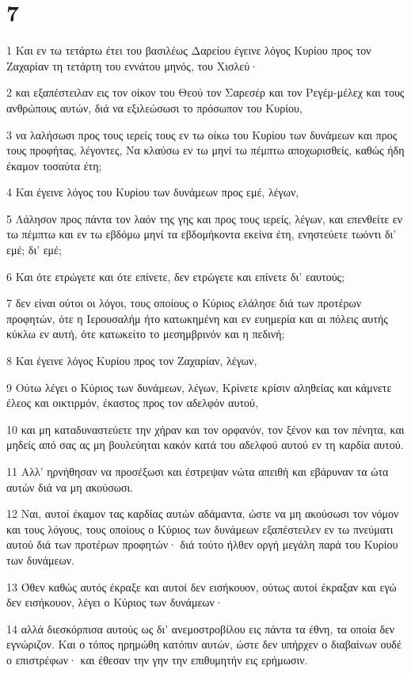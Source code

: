 \chapter{7}

\par 1 Και εν τω τετάρτω έτει του βασιλέως Δαρείου έγεινε λόγος Κυρίου προς τον Ζαχαρίαν τη τετάρτη του εννάτου μηνός, του Χισλεύ·
\par 2 και εξαπέστειλαν εις τον οίκον του Θεού τον Σαρεσέρ και τον Ρεγέμ-μέλεχ και τους ανθρώπους αυτών, διά να εξιλεώσωσι το πρόσωπον του Κυρίου,
\par 3 να λαλήσωσι προς τους ιερείς τους εν τω οίκω του Κυρίου των δυνάμεων και προς τους προφήτας, λέγοντες, Να κλαύσω εν τω μηνί τω πέμπτω αποχωρισθείς, καθώς ήδη έκαμον τοσαύτα έτη;
\par 4 Και έγεινε λόγος του Κυρίου των δυνάμεων προς εμέ, λέγων,
\par 5 Λάλησον προς πάντα τον λαόν της γης και προς τους ιερείς, λέγων, και επενθείτε εν τω πέμπτω και εν τω εβδόμω μηνί τα εβδομήκοντα εκείνα έτη, ενηστεύετε τωόντι δι' εμέ; δι' εμέ;
\par 6 Και ότε ετρώγετε και ότε επίνετε, δεν ετρώγετε και επίνετε δι' εαυτούς;
\par 7 δεν είναι ούτοι οι λόγοι, τους οποίους ο Κύριος ελάλησε διά των προτέρων προφητών, ότε η Ιερουσαλήμ ήτο κατωκημένη και εν ευημερία και αι πόλεις αυτής κύκλω εν αυτή, ότε κατωκείτο το μεσημβρινόν και η πεδινή;
\par 8 Και έγεινε λόγος Κυρίου προς τον Ζαχαρίαν, λέγων,
\par 9 Ούτω λέγει ο Κύριος των δυνάμεων, λέγων, Κρίνετε κρίσιν αληθείας και κάμνετε έλεος και οικτιρμόν, έκαστος προς τον αδελφόν αυτού,
\par 10 και μη καταδυναστεύετε την χήραν και τον ορφανόν, τον ξένον και τον πένητα, και μηδείς από σας ας μη βουλεύηται κακόν κατά του αδελφού αυτού εν τη καρδία αυτού.
\par 11 Αλλ' ηρνήθησαν να προσέξωσι και έστρεψαν νώτα απειθή και εβάρυναν τα ώτα αυτών διά να μη ακούσωσι.
\par 12 Ναι, αυτοί έκαμον τας καρδίας αυτών αδάμαντα, ώστε να μη ακούσωσι τον νόμον και τους λόγους, τους οποίους ο Κύριος των δυνάμεων εξαπέστειλεν εν τω πνεύματι αυτού διά των προτέρων προφητών· διά τούτο ήλθεν οργή μεγάλη παρά του Κυρίου των δυνάμεων.
\par 13 Όθεν καθώς αυτός έκραξε και αυτοί δεν εισήκουον, ούτως αυτοί έκραξαν και εγώ δεν εισήκουον, λέγει ο Κύριος των δυνάμεων·
\par 14 αλλά διεσκόρπισα αυτούς ως δι' ανεμοστροβίλου εις πάντα τα έθνη, τα οποία δεν εγνώριζον. Και ο τόπος ηρημώθη κατόπιν αυτών, ώστε δεν υπήρχεν ο διαβαίνων ουδέ ο επιστρέφων· και έθεσαν την γην την επιθυμητήν εις ερήμωσιν.

